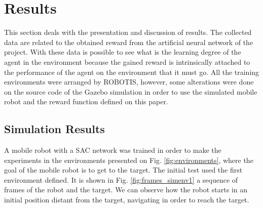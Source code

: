 \section{Results}

This section deals with the presentation and discussion of results.
The collected data are related to the obtained reward from the artificial neural network of the project.
With these data is possible to see what is the learning degree of the agent in the environment because the gained reward is intrinsically attached to the performance of the agent on the environment that it must go.
All the training environments were arranged by ROBOTIS, however, some alterations were done on the source code of the Gazebo simulation in order to use the simulated mobile robot and the reward function defined on this paper.

\subsection{Simulation Results}

A mobile robot with a SAC network was trained in order to make the experiments in the environments presented on Fig. \ref{fig:environments}, where the goal of the mobile robot is to get to the target.
The initial test used the first environment defined. It is shown in Fig. \ref{fig:frames_simenv1} a sequence of frames of the robot and the target. 
We can observe how the robot starts in an initial position distant from the target, navigating in order to reach the target.

